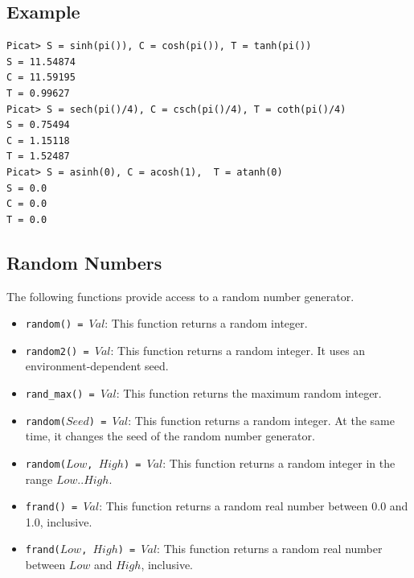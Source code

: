 \subsection*{Example}
\begin{verbatim}
Picat> S = sinh(pi()), C = cosh(pi()), T = tanh(pi())
S = 11.54874
C = 11.59195
T = 0.99627
Picat> S = sech(pi()/4), C = csch(pi()/4), T = coth(pi()/4)
S = 0.75494
C = 1.15118
T = 1.52487
Picat> S = asinh(0), C = acosh(1),  T = atanh(0)
S = 0.0
C = 0.0
T = 0.0
\end{verbatim}

\subsection{Random Numbers}
The following functions provide access to a random number generator.
\begin{itemize}
\item \texttt{random() = $Val$}: This function returns a random integer.
\item \texttt{random2() = $Val$}: This function returns a random integer.  It uses an environment-dependent seed.
\item \texttt{rand\_max() = $Val$}: This function returns the maximum random integer.
\item \texttt{random($Seed$) = $Val$}: This function returns a random integer.  At the same time, it changes the seed of the random number generator.
\item \texttt{random($Low$, $High$) = $Val$}: This function returns a random integer in the range $Low$..$High$.
\item \texttt{frand() = $Val$}: This function returns a random real number between 0.0 and 1.0, inclusive.
\item \texttt{frand($Low$, $High$) = $Val$}: This function returns a random real number between $Low$ and $High$, inclusive.

\end{itemize}

